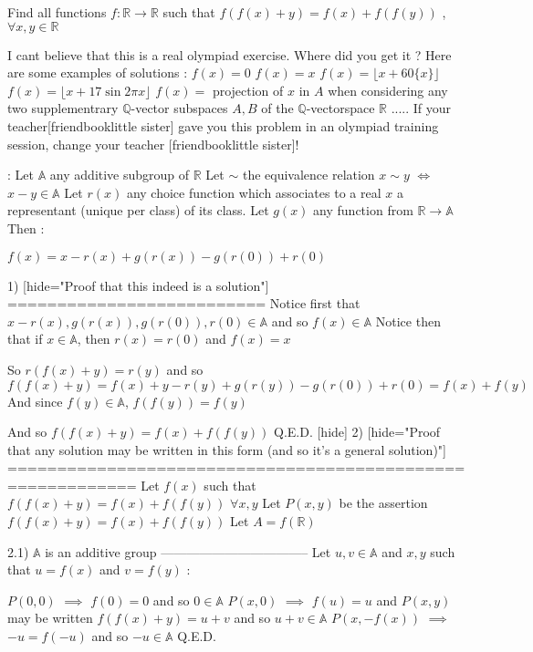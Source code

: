 \begin{solution}
	\begin{tcolorbox}Find all functions $f: \mathbb{R} \rightarrow \mathbb{R}$ such that $f(f(x)+y)=f(x)+f(f(y))$ , $\forall x,y \in \mathbb{R}$\end{tcolorbox}
I cant believe that this is a real olympiad exercise. Where did you get it ?
Here are some examples of solutions :
$f(x)=0$
$f(x)=x$
$f(x)=\lfloor x+60\{x\}\rfloor$
$f(x)=\lfloor x+17\sin 2\pi x\rfloor$
$f(x)=$ projection of $x$ in $A$ when considering any two supplementrary $\mathbb Q$-vector subspaces $A,B$ of the $\mathbb Q$-vectorspace $\mathbb R$
.....
If your teacher[friend\/book\/little sister] gave you this problem in an olympiad training session, change your teacher [friend\/book\/little sister]!


 :
Let $\mathbb A$ any additive subgroup of $\mathbb R$
Let $\sim$ the equivalence relation $x\sim y$ $\iff$ $x-y\in\mathbb A$
Let $r(x)$ any choice function which associates to a real $x$ a representant (unique per class) of its class.
Let $g(x)$ any function from $\mathbb R\to\mathbb A$
Then :

$f(x)=x-r(x)+g(r(x))-g(r(0))+r(0)$

1) [hide="Proof that this indeed is a solution"]
==========================
Notice first that $x-r(x),g(r(x)),g(r(0)),r(0)\in\mathbb A$ and so $f(x)\in\mathbb A$
Notice then that if $x\in\mathbb A$, then $r(x)=r(0)$ and $f(x)=x$

So $r(f(x)+y)=r(y)$ and so $f(f(x)+y)=f(x)+y-r(y)+g(r(y))-g(r(0))+r(0)=f(x)+f(y)$
And since $f(y)\in\mathbb A$, $f(f(y))=f(y)$

And so $f(f(x)+y)=f(x)+f(f(y))$
Q.E.D.
[\/hide]
2) [hide="Proof that any solution may be written in this form (and so it's a general solution)"]
===========================================================
Let $f(x)$ such that $f(f(x)+y)=f(x)+f(f(y))$ $\forall x,y$
Let $P(x,y)$ be the assertion $f(f(x)+y)=f(x)+f(f(y))$
Let $A=f(\mathbb R)$

2.1) $\mathbb A$ is an additive group
-----------------------------------
Let $u,v\in\mathbb A$ and $x,y$ such that $u=f(x)$ and $v=f(y)$ :

$P(0,0)$ $\implies$ $f(0)=0$ and so $0\in \mathbb A$
$P(x,0)$ $\implies$ $f(u)=u$ and $P(x,y)$ may be written $f(f(x)+y)=u+v$ and so $u+v\in\mathbb A$
$P(x,-f(x))$ $\implies$ $-u=f(-u)$ and so $-u\in\mathbb A$
Q.E.D.


\end{solution}
